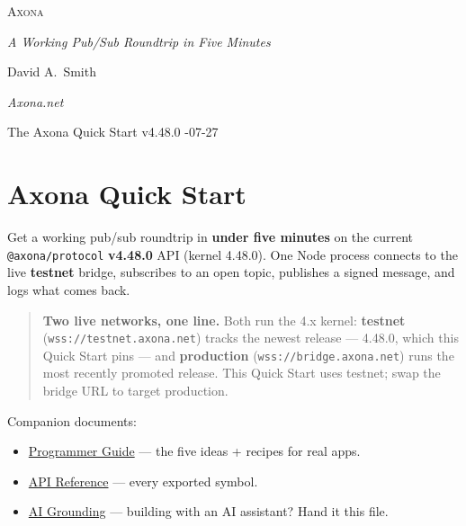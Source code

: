 \documentclass[
  nobib]{tufte-handout}
\author{}
\date{}
\providecommand{\tightlist}{%
  \setlength{\itemsep}{0pt}\setlength{\parskip}{0pt}}
\begin{document}
\thispagestyle{empty}
\null\vfill
\begin{center}
{\fontsize{48}{52}\selectfont \textsc{Axona}\par}
\vspace{0.6em}
{\Large\itshape A Working Pub/Sub Roundtrip in Five Minutes\par}
\vspace{4em}
{\large David A.~Smith\par}
{\itshape\small Axona.net\par}
\vspace{2em}
{\small The Axona Quick Start \quad v4.48.0 -07-27\par}
\end{center}
\vfill
\null
\newpage
\pagestyle{ndhtplain}
\thispagestyle{ndhtplain}
\setcounter{page}{1}

\section{Axona Quick Start}\label{axona-quick-start}

Get a working pub/sub roundtrip in \textbf{under five minutes} on the
current \texttt{@axona/protocol} \textbf{v4.48.0} API (kernel 4.48.0).
One Node process connects to the live \textbf{testnet} bridge,
subscribes to an open topic, publishes a signed message, and logs what
comes back.

\begin{quote}
\textbf{Two live networks, one line.} Both run the 4.x kernel:
\textbf{testnet} (\texttt{wss://testnet.axona.net}) tracks the newest
release --- 4.48.0, which this Quick Start pins --- and
\textbf{production} (\texttt{wss://bridge.axona.net}) runs the most
recently promoted release. This Quick Start uses testnet; swap the
bridge URL to target production.
\end{quote}

Companion documents:

\begin{itemize}
\tightlist
\item
  \href{Axona-Programmer-Guide-v4.38.0.md}{Programmer Guide} --- the
  five ideas + recipes for real apps.
\item
  \href{Axona-API-Reference-v4.48.0.md}{API Reference} --- every
  exported symbol.
\item
  \href{Axona-AI-Grounding-v4.48.0.md}{AI Grounding} --- building with
  an AI assistant? Hand it this file.
\end{itemize}
\end{document}
